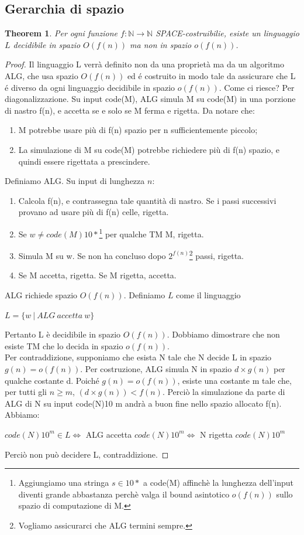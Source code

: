 \documentclass[a4paper, 12pt]{article}
\newtheorem{theorem}{Theorem}[section]
\begin{document}
\subsection{Gerarchia di spazio}
\begin{theorem}
\label{gerarchiaSpazio}
Per ogni funzione $f: \mathbb{N} \rightarrow \mathbb{N}$ SPACE-costruibilie, esiste un linguaggio $L$ decidibile in spazio $O(f(n))$ ma non in spazio $o(f(n))$.
\end{theorem}
\begin{proof}
Il linguaggio L verrà definito non da una proprietà ma da un algoritmo ALG, che usa spazio $O(f(n))$ ed é costruito in modo tale da assicurare che L é diverso da ogni linguaggio decidibile in spazio $o(f(n))$. Come ci riesce? Per diagonalizzazione. Su input code(M), ALG simula M su code(M) in una porzione di nastro f(n), e accetta se e solo se M ferma e rigetta. Da notare che:
\begin{enumerate}
\item M potrebbe usare più di f(n) spazio per n sufficientemente piccolo;
\item  La simulazione di M su code(M) potrebbe richiedere più di f(n) spazio, e quindi essere rigettata a prescindere.
\end{enumerate}
Definiamo ALG. Su input di lunghezza $n$:
\begin{enumerate}
\item Calcola f(n), e contrassegna tale quantità di nastro. Se i passi successivi provano ad usare più di f(n) celle, rigetta.
\item Se $w \neq code(M)10*$\footnote{Aggiungiamo una stringa $s \in 10*$ a code(M) affinch\`e la lunghezza dell'input diventi grande abbastanza perch\`e valga il bound asintotico $o(f(n))$ sullo spazio di computazione di M.} per qualche TM M, rigetta.
\item Simula M su w. Se non ha concluso dopo $2^{f(n)}$\footnote{Vogliamo assicurarci che ALG termini sempre.} passi, rigetta.
\item Se M accetta, rigetta. Se M rigetta, accetta.
\end{enumerate}
ALG richiede spazio $O(f(n))$. Definiamo $L$ come il linguaggio
\begin{center}
$L = \{w\ |\ ALG\ accetta\ w\}$
\end{center}
Pertanto L \`e decidibile in spazio $O(f(n))$.  Dobbiamo dimostrare che non esiste TM che lo decida in spazio $o(f(n))$.\\
Per contraddizione, supponiamo che esista N tale che N decide L in
spazio $g(n) = o(f(n))$.
Per costruzione, ALG simula N in spazio $d \times g(n)$ per qualche
costante d. Poiché $g(n) = o(f(n))$, esiste una costante m tale che, per
tutti gli $n \geq m$, $(d \times g(n)) < f(n)$.
Perciò la simulazione da parte di ALG di N su input code(N)10 m
andrà a buon fine nello spazio allocato f(n). Abbiamo:
\begin{center}
$code(N)10^{m} \in L \iff$ ALG accetta $code(N)10^{m} \iff$ N rigetta $code(N)10^{m}$
\end{center}
Perci\`o non pu\`o decidere L, contraddizione. 
\end{proof}
\end{document}
